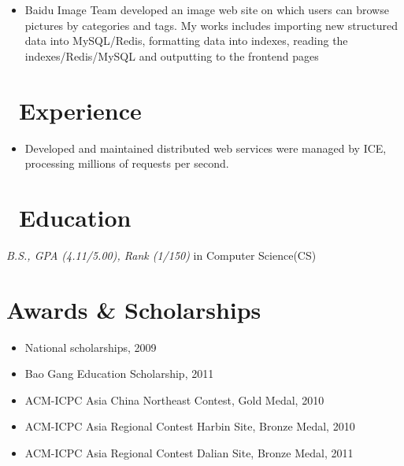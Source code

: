\documentclass{resume}
\begin{document}
 {}{}
\begin{itemize}
    \item Baidu Image Team developed an image web site on which users can browse pictures by categories and tags. My works includes importing new structured data into MySQL/Redis, formatting data into indexes, reading the indexes/Redis/MySQL and outputting to the frontend pages
\end{itemize}

\section{\faUsers\ Experience}
 {}{}
\begin{itemize}
    \item  Developed and maintained distributed web services were managed by ICE, processing millions of requests per second.
\end{itemize}

\section{\faGraduationCap\ Education}
\textit{B.S.,  GPA (4.11/5.00), Rank (1/150)} in Computer Science(CS)

\section{Awards \& Scholarships}
\begin{itemize}
    \item National scholarships, 2009
    \item Bao Gang Education Scholarship, 2011
    \item ACM-ICPC Asia China Northeast Contest, Gold Medal, 2010
    \item ACM-ICPC Asia Regional Contest Harbin Site, Bronze Medal, 2010
    \item ACM-ICPC Asia Regional Contest Dalian Site, Bronze Medal, 2011
\end{itemize}
\end{document}
